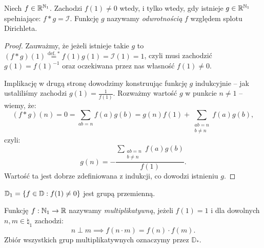 \begin{theorem}
	\label{nt:dirichletinverse}
	Niech \(f \in \mathbb{R}^{\mathbb{N}_1}\).
	Zachodzi \(f(1) \neq 0\) wtedy, i tylko wtedy, gdy
	istnieje \(g \in \mathbb{R}^{\mathbb{N}_1}\) spełniające: \(f * g = \mathcal I\).
	Funkcję \(g\) nazywamy \textit{odwrotnością} \(f\) względem splotu Dirichleta.
\end{theorem}
\begin{proof}
	Zauważmy, że jeżeli istnieje takie \(g\) to \((f * g)(1) \stackrel{\text{def. }*}{=} f(1)g(1) = \mathcal I(1) = 1\),
	czyli musi zachodzić \(g(1) = f(1)^{-1}\) oraz oczekiwana przez nas własność \(f(1) \neq 0\).

	Implikację w drugą stronę dowodzimy konstruując funkcję \(g\) indukcyjnie -- jak ustaliliśmy zachodzi \(g(1) = \frac{1}{f(1)}\).
	Rozważmy wartość \(g\) w punkcie \(n \neq 1\) -- wiemy, że:
	\[(f*g)(n) = 0 = \sum_{ab = n} f(a)g(b) = g(n)f(1) + \sum_{\substack{ab = n \\ b \neq n}} f(a)g(b),\]
	czyli:
	\[g(n) = -\frac{\sum_{\substack{ab = n \\ b \neq n}} f(a)g(b)}{f(1)}.\]
	Wartość ta jest dobrze zdefiniowana z indukcji, co dowodzi istnieniu \(g\).

\end{proof}

\begin{corollary}
	\(\mathbb D_1 = \set{f \in \mathbb D : f(1) \neq 0}\) jest grupą przemienną.
\end{corollary}

\begin{definition}
	Funkcję \(f: \mathbb{N}_1 \to \mathbb{R}\) nazywamy \textit{multiplikatywną}, jeżeli \(f(1) = 1\) i dla dowolnych \(n, m \in \natural_1\) zachodzi:
	\[n \perp m \implies f(n \cdot m) = f(n) \cdot f(m).\]
	Zbiór wszystkich grup multiplikatywnych oznaczymy przez \(\mathbb D_*\).
\end{definition}

